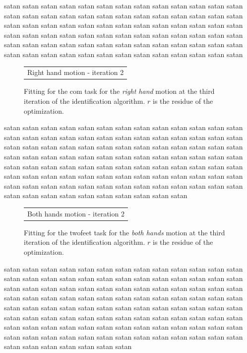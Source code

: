 \documentclass[letterpaper, 10pt, conference]{ieeeconf}      %
\begin{document}
satan satan satan satan satan satan satan satan satan satan satan
satan satan satan satan satan satan satan satan satan satan satan
satan satan satan satan satan satan satan satan satan satan satan
satan satan satan satan satan satan satan satan satan satan satan
satan satan satan satan satan satan satan satan satan satan satan
satan satan satan satan satan satan satan satan satan satan satan
satan satan satan satan satan satan satan satan satan satan satan
satan

\begin{figure}[t]
  \centering
  \resizebox{.48\textwidth}{!} {
  \begin{tabular}{c}
	\\
  Right hand motion - iteration 2
  \end{tabular}
  }
\caption{Fitting for the com task for the \emph{right hand} motion at the third iteration of the identification algorithm.
$r$ is the residue of the optimization.}
\label{fig:exp1:taskCom2}
\end{figure}

satan
satan satan satan satan satan satan satan satan satan satan satan
satan satan satan satan satan satan satan satan satan satan satan
satan satan satan satan satan satan satan satan satan satan satan
satan satan satan satan satan satan satan satan satan satan satan
satan satan satan satan satan satan satan satan satan satan satan
satan satan satan satan satan satan satan satan satan satan satan
satan satan satan satan satan satan satan satan satan satan satan
satan satan satan satan satan satan satan satan satan satan satan
satan satan satan satan satan satan satan satan satan satan satan
satan

\begin{figure}[t]
  \centering
  \resizebox{.48\textwidth}{!} {
  \begin{tabular}{c}
	\\
  Both hands motion - iteration 2
  \end{tabular}
    }
\caption{Fitting for the twofeet task for the \emph{both hands} motion at the third iteration of the identification algorithm.
$r$ is the residue of the optimization.}
\label{fig:exp1:taskTwofeet2}
\end{figure}

satan satan satan satan satan satan satan satan satan satan satan
satan satan satan satan satan satan satan satan satan satan satan
satan satan satan satan satan satan satan satan satan satan satan
satan satan satan satan satan satan satan satan satan satan satan
satan satan satan satan satan satan satan satan satan satan satan
satan satan satan satan satan satan satan satan satan satan satan
satan satan satan satan satan satan satan satan satan satan satan
satan satan satan satan satan satan satan satan satan satan satan
satan satan satan satan satan satan satan satan satan satan satan
satan satan satan satan satan satan satan satan satan satan satan
satan
\end{document}
